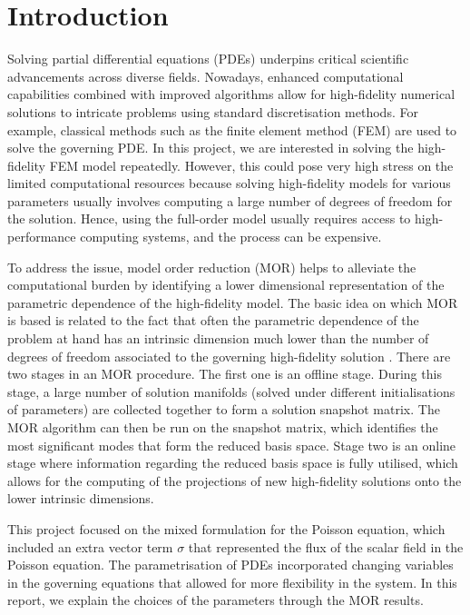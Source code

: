 \section{Introduction}
Solving partial differential equations (PDEs) underpins critical scientific advancements across diverse fields. Nowadays, enhanced computational capabilities combined with improved algorithms allow for high-fidelity numerical solutions to intricate problems using standard discretisation methods. For example, classical methods such as the finite element method (FEM) are used to solve the governing PDE. In this project, we are interested in solving the high-fidelity FEM model repeatedly. However, this could pose very high stress on the limited computational resources because solving high-fidelity models for various parameters usually involves computing a large number of degrees of freedom for the solution. Hence, using the full-order model usually requires access to high-performance computing systems, and the process can be expensive. 

To address the issue, model order reduction (MOR) helps to alleviate the computational burden by identifying a lower dimensional representation of the parametric dependence of the high-fidelity model. The basic idea on which MOR is based is related to the fact that often the parametric dependence of the problem at hand has an intrinsic dimension much lower than the number of degrees of freedom associated to the governing high-fidelity solution \cite{shah2022finite}. There are two stages in an MOR procedure. The first one is an offline stage. During this stage, a large number of solution manifolds (solved under different initialisations of parameters) are collected together to form a solution snapshot matrix. The MOR algorithm can then be run on the snapshot matrix, which identifies the most significant modes that form the reduced basis space. Stage two is an online stage where information regarding the reduced basis space is fully utilised, which allows for the computing of the projections of new high-fidelity solutions onto the lower intrinsic dimensions. 

This project focused on the mixed formulation for the Poisson equation, which included an extra vector term $\sigma$ that represented the flux of the scalar field in the Poisson equation. The parametrisation of PDEs incorporated changing variables in the governing equations that allowed for more flexibility in the system. In this report, we explain the choices of the parameters through the MOR results. 

